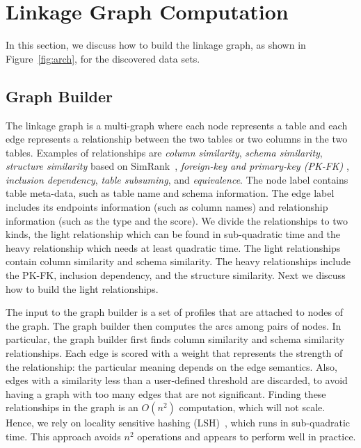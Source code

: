 \section{Linkage Graph Computation}
\label{sec:stitching}
 In this section, we
discuss how to build the linkage graph, as shown in Figure~\ref{fig:arch}, for the discovered data sets.



\subsection{Graph Builder}\label{subsec:graphbuild}



The linkage graph is a multi-graph where each node represents a table and each
edge represents a relationship between the two tables or two columns in the two
tables. Examples of relationships are \emph{column similarity}, \emph{schema
similarity}, \emph{structure similarity} based on SimRank~\cite{DBLP:conf/kdd/JehW02}, \emph{foreign-key and primary-key (PK-FK)} , \emph{inclusion dependency}, \emph{table subsuming}, and \emph{equivalence}. The node label contains table meta-data, such as table name and schema information. The edge label includes its endpoints information (such as column names) and relationship information (such as the type and the score). We divide the relationships to two kinds, the light relationship which can be found in sub-quadratic time and the heavy relationship which needs at least quadratic time. The light relationships contain column similarity and schema similarity. The heavy relationships include the PK-FK, inclusion dependency, and the structure similarity. Next we discuss how to build the light relationships.


The input to the graph builder is a set of profiles that are attached to nodes of the graph. The graph builder then computes the arcs among pairs of nodes. In particular, the graph builder first finds column similarity and schema similarity relationships. Each edge is scored with a weight that represents the strength of the relationship: the particular meaning depends on the edge semantics.  Also, edges with a similarity less than a user-defined threshold are discarded, to avoid having a graph with too many edges that are not significant. Finding these relationships in the graph is an $O(n^2)$ computation, which will not scale.  Hence, we rely on locality sensitive hashing (LSH)~\cite{DBLP:conf/compgeom/DatarIIM04}, which runs in sub-quadratic time. This approach avoids $n^2$ operations and appears to perform well in practice.



